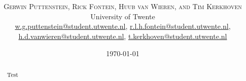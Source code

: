 \documentclass[twoside]{article}
\title{\vspace{-15mm}\fontsize{24pt}{10pt}\selectfont\textbf{\articletitle}} %
\author{
\large
\textsc{Gerwin Puttenstein, Rick Fontein, Huub van Wieren, and Tim Kerkhoven}\\[2mm] %
\normalsize University of Twente \\ %
\normalsize \href{mailto:w.g.puttenstein@student.utwente.nl}{w.g.puttenstein@student.utwente.nl}, 
\href{mailto:r.l.h.fontein@student.utwente.nl}{r.l.h.fontein@student.utwente.nl},\\
\normalsize \href{mailto:h.d.vanwieren@student.utwente.nl}{h.d.vanwieren@student.utwente.nl},
\href{mailto:t.kerkhoven@student.utwente.nl}{t.kerkhoven@student.utwente.nl}%
}
\date{\today}
\begin{document}
\thispagestyle{empty}
\maketitle %


\begin{abstract}

\noindent Test

\end{abstract}

\end{document}
